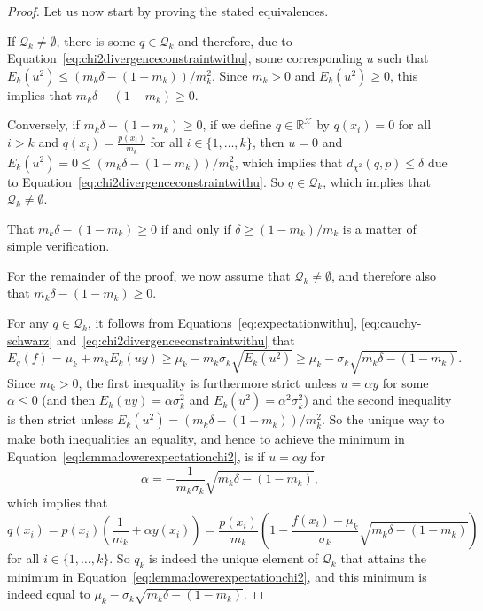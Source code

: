 \documentclass{article}
\begin{document}
\begin{proof}
Let us now start by proving the stated equivalences.

If $\mathcal{Q}_k\neq\emptyset$, there is some $q\in\mathcal{Q}_k$ and therefore, due to Equation~\eqref{eq:chi2divergenceconstraintwithu}, some corresponding $u$ such that $E_k(u^2)\leq(m_k\delta-(1-m_k))/m_k^2$. Since $m_k>0$ and $E_k(u^2)\geq0$, this implies that $m_k\delta-(1-m_k)\geq0$. 

Conversely, if $m_k\delta-(1-m_k)\geq0$, if we define $q\in\mathbb{R}^\mathcal{X}$ by $q(x_i)=0$ for all $i>k$ and $q(x_i)=\frac{p(x_i)}{m_k}$ for all $i\in\{1,\ldots,k\}$, then $u=0$ and $E_k(u^2)=0\leq(m_k\delta-(1-m_k))/m_k^2$, which implies that $d_{\chi^2}(q,p)\leq\delta$ due to Equation~\eqref{eq:chi2divergenceconstraintwithu}. So $q\in\mathcal{Q}_k$, which implies that $\mathcal{Q}_k\neq\emptyset$.

That $m_k\delta-(1-m_k)\geq0$ if and only if $\delta\geq(1-m_k)/m_k$ is a matter of simple verification.

For the remainder of the proof, we now assume that $\mathcal{Q}_k\neq\emptyset$, and therefore also that $m_k\delta-(1-m_k)\geq0$.

For any $q\in\mathcal{Q}_k$, it follows from Equations~\eqref{eq:expectationwithu}, \eqref{eq:cauchy-schwarz} and~\eqref{eq:chi2divergenceconstraintwithu} that
\begin{equation*}
E_q(f)=\mu_k+m_kE_k\left(u y\right)
\geq\mu_k-m_k\sigma_k\sqrt{E_k(u^2)}
\geq\mu_k-\sigma_k\sqrt{m_k\delta-(1-m_k)}.
\end{equation*}
Since $m_k>0$, the first inequality is furthermore strict unless $u=\alpha y$ for some $\alpha\leq0$ (and then $E_k(uy)=\alpha\sigma_k^2$ and $E_k(u^2)=\alpha^2\sigma_k^2$) and the second inequality is then strict unless $E_k(u^2)=(m_k\delta-(1-m_k))/m_k^2$. So the unique way to make both inequalities an equality, and hence to achieve the minimum in Equation~\eqref{eq:lemma:lowerexpectationchi2}, is if $u=\alpha y$ for
\begin{equation*}
\alpha=-\frac{1}{m_k\sigma_k}\sqrt{m_k\delta-(1-m_k)},
\end{equation*}
which implies that
\begin{equation*}
    q(x_i)=p(x_i)\left(\frac{1}{m_k}+\alpha y(x_i)\right)=\frac{p(x_i)}{m_k}\left(1-\frac{f(x_i)-\mu_k}{\sigma_k}\sqrt{m_k\delta-(1-m_k)}\right)
\end{equation*}
for all $i\in\{1,\ldots,k\}$. So $q_k$ is indeed the unique element of $\mathcal{Q}_k$ that attains the minimum in Equation~\eqref{eq:lemma:lowerexpectationchi2}, and this minimum is indeed equal to $\mu_k-\sigma_k\sqrt{m_k\delta-(1-m_k)}$.


\end{proof}
\end{document}
